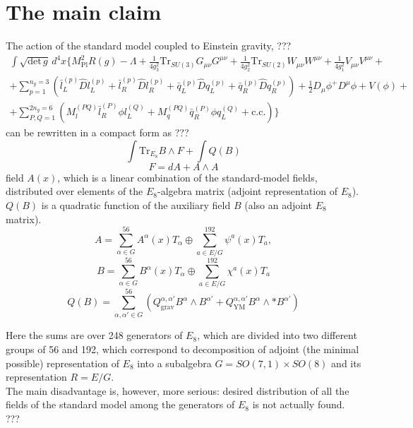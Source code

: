 \documentclass{article}
\begin{document}
\section{The main claim}
The action of the standard model coupled to Einstein gravity, ???
\begin{multline}
    \int \sqrt{\text{det}\, g} \, d^4x \{ M_{\text{Pl}}^2 R(g) - \Lambda + \frac{1}{4g_3^2} \text{Tr}_{SU(3)} G_{\mu\nu} G^{\mu\nu} + \frac{1}{4g_2^2} \text{Tr}_{SU(2)} W_{\mu\nu} W^{\mu\nu} + \frac{1}{4g_1^2} V_{\mu\nu} V^{\mu\nu} + \\ + \sum_{p=1}^{n_g=3} \left( \bar{l}^{(p)}_L \hat{D} l^{(p)}_L + \bar{l}^{(p)}_R \hat{D} l^{(p)}_R + \bar{q}^{(p)}_L \hat{D} q^{(p)}_L + \bar{q}^{(p)}_R \hat{D} q^{(p)}_R \right) + \frac{1}{2} D_\mu \phi^+ D^\mu \phi + V(\phi) + 
    \\ + \sum_{P,Q=1}^{2n_g=6} \left( M^{(PQ)}_l \bar{l}^{(P)}_R \phi l^{(Q)}_L + M^{(PQ)}_q \bar{q}^{(P)}_R \phi q^{(Q)}_L + \text{c.c.} \right) \}
\end{multline}
can be rewritten in a compact form as ???
\begin{equation}
    \int \text{Tr}_{E_8} B \wedge F + \int Q(B)
\end{equation}
\begin{equation}
    F = dA + A \wedge A
\end{equation}
field $A(x)$, which is a linear combination of the standard-model fields, distributed over elements of the $E_8$-algebra matrix (adjoint representation of $E_8$). \\
$Q(B)$ is a quadratic function of the auxiliary field $B$ (also an adjoint $E_8$ matrix). \\

\begin{equation}
    A = \sum_{\alpha \in G}^{56} A^\alpha(x) T_\alpha \oplus \sum_{a \in E/G}^{192} \psi^a(x) T_a,
\end{equation}
\begin{equation}
    B = \sum_{\alpha \in G}^{56} B^\alpha(x) T_\alpha \oplus \sum_{a \in E/G}^{192} \chi^a(x) T_a
\end{equation}
\begin{equation}
    Q(B) = \sum_{\alpha, \alpha' \in G}^{56} \left( Q_{\text{grav}}^{\alpha, \alpha'} B^\alpha \wedge B^{\alpha'} + Q_{\text{YM}}^{\alpha, \alpha'} B^\alpha \wedge *B^{\alpha'} \right)
\end{equation}

Here the sums are over 248 generators of $E_8$, which are divided into two different groups of 56 and 192, which correspond to decomposition of adjoint (the minimal possible) representation of $E_8$ into a subalgebra $G = SO(7,1) \times SO(8)$ and its representation $R = E/G$.\\ 
The main disadvantage is, however, more serious: desired distribution of all the fields of the standard model among the generators of $E_8$ is not actually found. ??? \\
\end{document}
